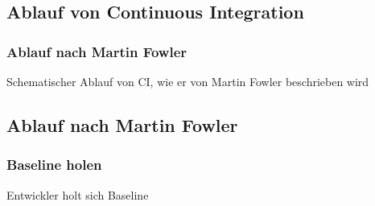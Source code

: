 \documentclass[hyperref={pdfpagelabels=false}]{beamer}
\begin{document}
\subsection{Ablauf von Continuous Integration}
\begin{frame} [t]
\frametitle{Ablauf nach Martin Fowler}
\begin{figure}[h]
  \centering
\end{figure}
\vspace{0.5cm} 
Schematischer Ablauf von CI, wie er von Martin Fowler beschrieben wird
\end{frame}

\subsection{Ablauf nach Martin Fowler}
\begin{frame} [t]
\frametitle{Baseline holen}
\begin{figure}[h]
  \centering
\end{figure}
\vspace{0.5cm} 
Entwickler holt sich Baseline
\end{frame}
\end{document}
